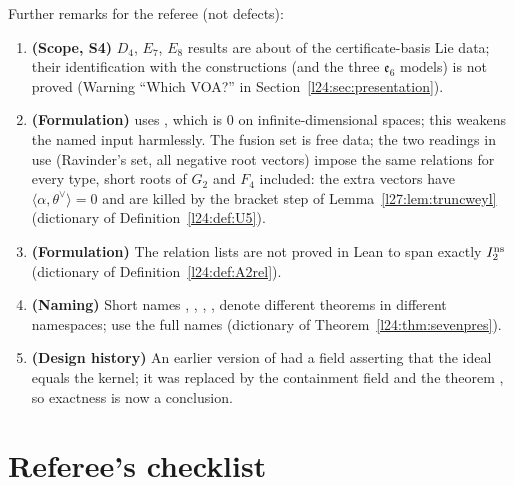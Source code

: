 Further remarks for the referee (not defects):
\begin{enumerate}
\item \textbf{(Scope, S4)} $D_4$, $E_7$, $E_8$ results are about  of the certificate-basis Lie data; their
  identification with the  constructions (and the three $\mathfrak e_6$ models) is not proved (Warning
  ``Which VOA?'' in Section~\ref{l24:sec:presentation}).
\item \textbf{(Formulation)}  uses , which is $0$ on infinite-dimensional
  spaces; this weakens the named input harmlessly. The fusion set is free data; the two readings in use (Ravinder's set, all
  negative root vectors) impose the same relations for every type, short roots of $G_2$ and $F_4$ included: the extra
  vectors have $\langle\alpha,\theta^\vee\rangle=0$ and are killed by the bracket step of Lemma~\ref{l27:lem:truncweyl}
  (dictionary of Definition~\ref{l24:def:U5}).
\item \textbf{(Formulation)} The relation lists are not proved in Lean to span exactly $I_2^{\mathrm{ns}}$ (dictionary of
  Definition~\ref{l24:def:A2rel}).
\item \textbf{(Naming)} Short names , , ,
  ,  denote different theorems in different namespaces; use the
  full names (dictionary of Theorem~\ref{l24:thm:sevenpres}).
\item \textbf{(Design history)} An earlier version of  had a field asserting that the ideal equals
  the kernel; it was replaced by the containment field  and the theorem
  , so exactness is now a conclusion.
\end{enumerate}

\section{Referee's checklist}\label{l24:sec:checklist}

